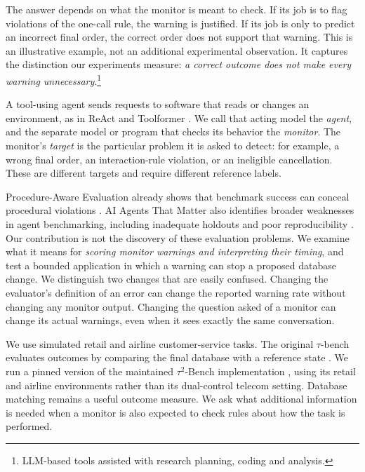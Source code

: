 \documentclass[10pt]{article}
\begin{document}
The answer depends on what the monitor is meant to check. If its job is to flag violations of the one-call rule, the warning is justified. If its job is only to predict an incorrect final order, the correct order does not support that warning. This is an illustrative example, not an additional experimental observation. It captures the distinction our experiments measure: \emph{a correct outcome does not make every warning unnecessary}.\footnote{LLM-based tools assisted with research planning, coding and analysis.}

A tool-using agent sends requests to software that reads or changes an environment, as in ReAct and Toolformer \citep{yao2023react,schick2023toolformer}. We call that acting model the \emph{agent}, and the separate model or program that checks its behavior the \emph{monitor}. The monitor's \emph{target} is the particular problem it is asked to detect: for example, a wrong final order, an interaction-rule violation, or an ineligible cancellation. These are different targets and require different reference labels.

Procedure-Aware Evaluation already shows that benchmark success can conceal procedural violations \citep{cao2026procedure}. AI Agents That Matter also identifies broader weaknesses in agent benchmarking, including inadequate holdouts and poor reproducibility \citep{kapoor2025agents}. Our contribution is not the discovery of these evaluation problems. We examine what it means for \emph{scoring monitor warnings and interpreting their timing}, and test a bounded application in which a warning can stop a proposed database change. We distinguish two changes that are easily confused. Changing the evaluator's definition of an error can change the reported warning rate without changing any monitor output. Changing the question asked of a monitor can change its actual warnings, even when it sees exactly the same conversation.

We use simulated retail and airline customer-service tasks. The original $\tau$-bench evaluates outcomes by comparing the final database with a reference state \citep{yao2024tau}. We run a pinned version of the maintained $\tau^2$-Bench implementation \citep{barres2025tau2}, using its retail and airline environments rather than its dual-control telecom setting. Database matching remains a useful outcome measure. We ask what additional information is needed when a monitor is also expected to check rules about how the task is performed.
\end{document}
